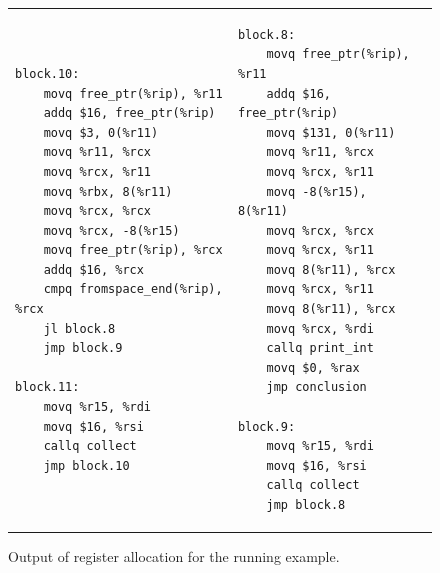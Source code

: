 \documentclass[7x10]{TimesAPriori_MIT}%
\numberwithin{theorem}{chapter}
\numberwithin{definition}{chapter}
\numberwithin{equation}{chapter}
\begin{document}
\begin{figure}[tbp]
\begin{tcolorbox}[colback=white]
{\begin{tabular}{lll}
\begin{minipage}{0.5\textwidth}
\begin{lstlisting}[basicstyle=\ttfamily\scriptsize]
block.10:
    movq free_ptr(%rip), %r11
    addq $16, free_ptr(%rip)
    movq $3, 0(%r11)
    movq %r11, %rcx
    movq %rcx, %r11
    movq %rbx, 8(%r11)
    movq %rcx, %rcx
    movq %rcx, -8(%r15)
    movq free_ptr(%rip), %rcx
    addq $16, %rcx
    cmpq fromspace_end(%rip), %rcx
    jl block.8
    jmp block.9

block.11:
    movq %r15, %rdi
    movq $16, %rsi
    callq collect
    jmp block.10
\end{lstlisting}
\end{minipage}
&
\begin{minipage}{0.5\textwidth}
\begin{lstlisting}[basicstyle=\ttfamily\scriptsize]
block.8:
    movq free_ptr(%rip), %r11
    addq $16, free_ptr(%rip)
    movq $131, 0(%r11)
    movq %r11, %rcx
    movq %rcx, %r11
    movq -8(%r15), 8(%r11)
    movq %rcx, %rcx
    movq %rcx, %r11
    movq 8(%r11), %rcx
    movq %rcx, %r11
    movq 8(%r11), %rcx
    movq %rcx, %rdi
    callq print_int
    movq $0, %rax
    jmp conclusion

block.9:
    movq %r15, %rdi
    movq $16, %rsi
    callq collect
    jmp block.8
\end{lstlisting}
\end{minipage}
\end{tabular}
\fi}
\end{tcolorbox}

\caption{Output of register allocation for the running example.}
\label{fig:reg-alloc-output}
\end{figure}
\end{document}
